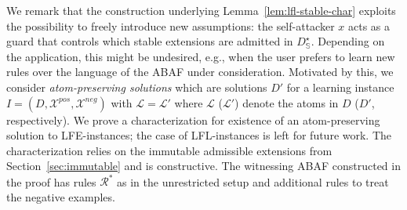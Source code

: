\documentclass[letterpaper]{article} %
\newcommand{\asms}{\asm}
\newcommand{\theory}{\mathit{Th}}
\newcommand{\lit}{\ensuremath{\mathcal{L}}}
\newcommand{\rules}{\ensuremath{\mathcal{R}}}
\newcommand{\asm}{\ensuremath{\mathcal{A}}}
\newcommand{\atoms}{\mathcal{L}}
\newcommand{\ruleset}{\mathcal{R}}
\newcommand{\assumptions}{\mathcal{A}}
\newcommand{\contra}{c}
\newcommand{\contrary}[1]{c(#1)}
\newcommand{\contraryempty}{c}
\newcommand{\ABAdef}{D=(\atoms,\ruleset,\assumptions,\contra)}
\newcommand{\setS}{\mathbb{S}}
\newcommand{\setT}{\mathbb{T}}
\newcommand{\contraryArgs}[1]{\asm^{c}_{#1}}
\newcommand{\Xpos}{\mathcal{X}^{pos}}
\newcommand{\Xneg}{\mathcal{X}^{neg}}
\newtheorem{definition}[example]{Definition}
\begin{document}
We remark that the construction underlying Lemma~\ref{lem:lfl-stable-char} exploits the possibility to freely introduce new assumptions: the self-attacker $x$ acts as a guard that controls which stable extensions are admitted in $D_\setS^\star$.
Depending on the application, this might be undesired, e.g., when the user prefers to learn new rules over the language of the ABAF under consideration. 
Motivated by this, we consider \emph{atom-preserving solutions} which are solutions $D'$ for a learning instance $I=(D,\Xpos,\Xneg)$ with 
$\lit=\lit'$ where $\lit$ ($\lit'$) denote the atoms in $D$ ($D'$, respectively).
% 
%
We prove a characterization for existence of an atom-preserving solution to LFE-instances; the case of LFL-instances is left for future work. The characterization relies on the immutable admissible extensions from Section~\ref{sec:immutable} and is constructive. The witnessing ABAF constructed in the proof has rules $\rules^*$ as in the unrestricted setup and additional rules to treat the negative examples. 
\end{document}
